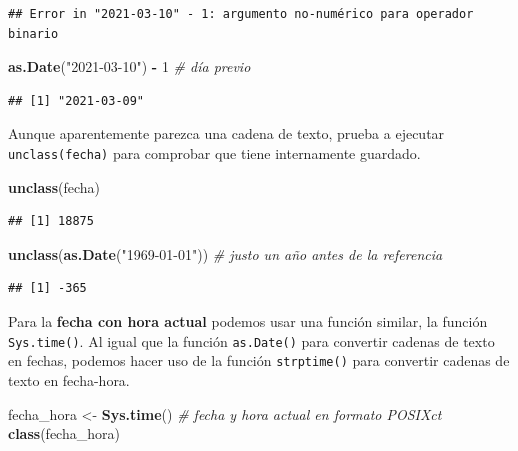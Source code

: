 \documentclass[11pt,]{book}
\newenvironment{Shaded}{\begin{snugshade}}{\end{snugshade}}
\newcommand{\CommentTok}[1]{\textcolor[rgb]{0.37,0.37,0.37}{\textit{#1}}}
\newcommand{\DecValTok}[1]{\textcolor[rgb]{0.06,0.06,0.06}{#1}}
\newcommand{\KeywordTok}[1]{\textcolor[rgb]{0.27,0.27,0.27}{\textbf{#1}}}
\newcommand{\NormalTok}[1]{#1}
\newcommand{\OperatorTok}[1]{\textcolor[rgb]{0.43,0.43,0.43}{\textbf{#1}}}
\newcommand{\StringTok}[1]{\textcolor[rgb]{0.5,0.5,0.5}{#1}}
\begin{document}
\begin{verbatim}
## Error in "2021-03-10" - 1: argumento no-numérico para operador binario
\end{verbatim}

\begin{Shaded}
\begin{Highlighting}[]
\KeywordTok{as.Date}\NormalTok{(}\StringTok{"2021-03-10"}\NormalTok{) }\OperatorTok{-}\StringTok{ }\DecValTok{1} \CommentTok{# día previo}
\end{Highlighting}
\end{Shaded}

\begin{verbatim}
## [1] "2021-03-09"
\end{verbatim}

Aunque aparentemente parezca una cadena de texto, prueba a ejecutar \texttt{unclass(fecha)} para comprobar que tiene internamente guardado.

\begin{Shaded}
\begin{Highlighting}[]
\KeywordTok{unclass}\NormalTok{(fecha)}
\end{Highlighting}
\end{Shaded}

\begin{verbatim}
## [1] 18875
\end{verbatim}

\begin{Shaded}
\begin{Highlighting}[]
\KeywordTok{unclass}\NormalTok{(}\KeywordTok{as.Date}\NormalTok{(}\StringTok{"1969-01-01"}\NormalTok{)) }\CommentTok{# justo un año antes de la referencia}
\end{Highlighting}
\end{Shaded}

\begin{verbatim}
## [1] -365
\end{verbatim}

Para la \textbf{fecha con hora actual} podemos usar una función similar, la función \texttt{Sys.time()}. Al igual que la función \texttt{as.Date()} para convertir cadenas de texto en fechas, podemos hacer uso de la función \texttt{strptime()} para convertir cadenas de texto en fecha-hora.

\begin{Shaded}
\begin{Highlighting}[]
\NormalTok{fecha_hora <-}\StringTok{ }\KeywordTok{Sys.time}\NormalTok{() }\CommentTok{# fecha y hora actual en formato POSIXct}
\KeywordTok{class}\NormalTok{(fecha_hora)}
\end{Highlighting}
\end{Shaded}
\end{document}
